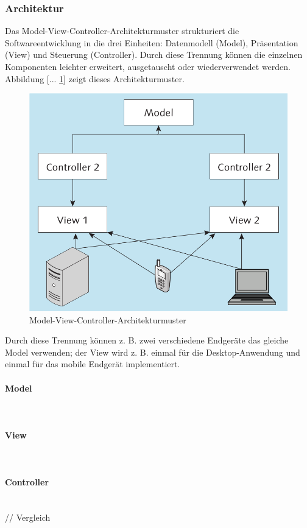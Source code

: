 \subsubsection{Architektur}
\glqq Das Model-View-Controller-Architekturmuster strukturiert die Softwareentwicklung in die drei Einheiten: Datenmodell (Model), Präsentation (View) und Steuerung (Controller). Durch diese Trennung können die einzelnen Komponenten leichter erweitert, ausgetauscht oder wiederverwendet werden. Abbildung [... \ref{fig:mvcarch}] zeigt dieses Architekturmuster.
	
\begin{figure}[htb]
  \centering
  \includegraphics[width=0.7\linewidth]{abb/mvc_arch}
  \caption[Model-View-Controller-Architekturmuster]{Model-View-Controller-Architekturmuster\footnotemark}
  \label{fig:mvcarch}
\end{figure}

Durch diese Trennung können z. B. zwei verschiedene Endgeräte das gleiche Model verwenden; der View wird z. B. einmal für die Desktop-Anwendung und einmal für das mobile Endgerät implementiert.\grqq{}\cite[S.123]{AntoEinf2014}

\paragraph{Model}$\;$ \\

\paragraph{View}$\;$ \\

\paragraph{Controller}$\;$ \\
// Vergleich\\

